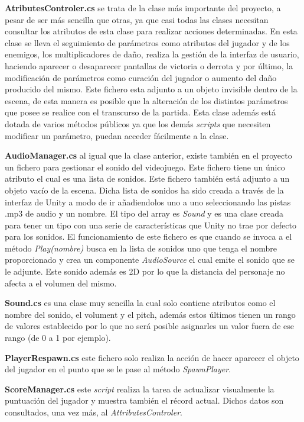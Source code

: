 \textbf{AtributesControler.cs} se trata de la clase más importante del proyecto, a pesar de ser más sencilla que otras, ya que casi todas las clases necesitan consultar los atributos de esta clase para realizar acciones determinadas. En esta clase se lleva el seguimiento de parámetros como atributos del jugador y de los enemigos, los multiplicadores de daño, realiza la gestión de la interfaz de usuario, haciendo aparecer o desaparecer pantallas de victoria o derrota y por último, la modificación de parámetros como curación del jugador o aumento del daño producido del mismo. Este fichero esta adjunto a un objeto invisible dentro de la escena, de esta manera es posible que la alteración de los distintos parámetros que posee se realice con el transcurso de la partida. Esta clase además está dotada de varios métodos públicos ya que los demás \textit{scripts} que necesiten modificar un parámetro, puedan acceder fácilmente a la clase.

\textbf{AudioManager.cs} al igual que la clase anterior, existe también en el proyecto un fichero para gestionar el sonido del videojuego. Este fichero tiene un único atributo el cual es una lista de sonidos. Este fichero también está adjunto a un objeto vacío de la escena. Dicha lista de sonidos ha sido creada a través de la interfaz de Unity a modo de ir añadiendolos uno a uno seleccionando las pistas .mp3 de audio y un nombre. El tipo del array es \textit{Sound} y es una clase creada para tener un tipo con una serie de características que Unity no trae por defecto para los sonidos. El funcionamiento de este fichero es que cuando se invoca a el método \textit{Play(nombre)} busca en la lista de sonidos uno que tenga el nombre proporcionado y crea un componente \textit{AudioSource} el cual emite el sonido que se le adjunte. Este sonido además es 2D por lo que la distancia del personaje no afecta a el volumen del mismo.

\textbf{Sound.cs} es una clase muy sencilla la cual solo contiene atributos como el nombre del sonido, el volument y el pitch, además estos últimos tienen un rango de valores establecido por lo que no será posible asignarles un valor fuera de ese rango (de 0 a 1 por ejemplo).

\textbf{PlayerRespawn.cs} este fichero solo realiza la acción de hacer aparecer el objeto del jugador en el punto que se le pase al método \textit{SpawnPlayer}.

\textbf{ScoreManager.cs} este \textit{script} realiza la tarea de actualizar visualmente la puntuación del jugador y muestra también el récord actual. Dichos datos son consultados, una vez más, al \textit{AttributesControler}.

